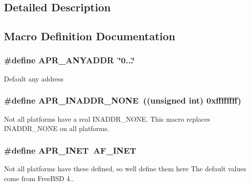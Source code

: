 \subsection{Detailed Description}


\subsection{Macro Definition Documentation}
\subsubsection[{\texorpdfstring{A\+P\+R\+\_\+\+A\+N\+Y\+A\+D\+DR}{APR_ANYADDR}}]{\setlength{\rightskip}{0pt plus 5cm}\#define A\+P\+R\+\_\+\+A\+N\+Y\+A\+D\+DR~\char`\"{}0...\char`\"{}}\hypertarget{group__apr__network__io_gadce1131c46b897ec63e9e4316a4631dd}{}\label{group__apr__network__io_gadce1131c46b897ec63e9e4316a4631dd}
Default \textquotesingle{}any\textquotesingle{} address 
\subsubsection[{\texorpdfstring{A\+P\+R\+\_\+\+I\+N\+A\+D\+D\+R\+\_\+\+N\+O\+NE}{APR_INADDR_NONE}}]{\setlength{\rightskip}{0pt plus 5cm}\#define A\+P\+R\+\_\+\+I\+N\+A\+D\+D\+R\+\_\+\+N\+O\+NE~((unsigned int) 0xffffffff)}\hypertarget{group__apr__network__io_ga16eb7ee55ff87a5093f2114ea5351217}{}\label{group__apr__network__io_ga16eb7ee55ff87a5093f2114ea5351217}
Not all platforms have a real I\+N\+A\+D\+D\+R\+\_\+\+N\+O\+NE. This macro replaces I\+N\+A\+D\+D\+R\+\_\+\+N\+O\+NE on all platforms. 
\subsubsection[{\texorpdfstring{A\+P\+R\+\_\+\+I\+N\+ET}{APR_INET}}]{\setlength{\rightskip}{0pt plus 5cm}\#define A\+P\+R\+\_\+\+I\+N\+ET~A\+F\+\_\+\+I\+N\+ET}\hypertarget{group__apr__network__io_gaa96e8e8dbf92bc77643a4032017b3d67}{}\label{group__apr__network__io_gaa96e8e8dbf92bc77643a4032017b3d67}
Not all platforms have these defined, so we\textquotesingle{}ll define them here The default values come from Free\+B\+SD 4.. 
